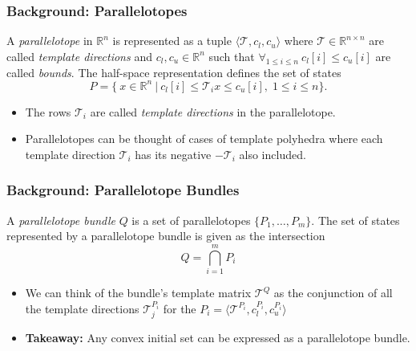 \documentclass{beamer}
\begin{document}
\begin{frame}
  \frametitle{\textbf{Background:} Parallelotopes}
  \begin{definition}
    A \emph{parallelotope} in $\mathbb{R}^n$ is represented as a tuple $\langle \mathcal{T}, c_{l}, c_{u} \rangle$ where $\mathcal{T} \in \mathbb{R}^{n \times n}$ are called \emph{template directions} and $c_{l}, c_{u} \in \mathbb{R}^{n}$ such that $\forall_{1 \leq i \leq n} ~  c_{l}[i] \leq c_{u}[i]$ are called \emph{bounds}. The half-space representation defines the set of states
    $$
    P = \{\: x \in \mathbb{R}^n \: | \: c_{l}[i] \leq \mathcal{T}_{i}x \leq c_{u}[i], \; 1 \leq i \leq n \}.
    $$
   \end{definition}

   \begin{itemize}
     \item The rows $\mathcal{T}_i$ are called \emph{template directions} in the parallelotope.
     \item Parallelotopes can be thought of cases of template polyhedra where each template direction $\mathcal{T}_i$ has its negative $-\mathcal{T}_i $ also included.
   \end{itemize}
\end{frame}



\begin{frame}
\frametitle{\textbf{Background:} Parallelotope Bundles}
\begin{definition}
  A \emph{parallelotope bundle} $Q$ is a set of parallelotopes $\{P_1, \ldots, P_m\}$. The set of states represented by a parallelotope bundle is given as the intersection
\[ Q = \bigcap_{i=1}^m P_i \]
\end{definition}

\begin{itemize}
  \item We can think of the bundle's template matrix $\mathcal{T}^Q$ as the conjunction of all the template directions $\mathcal{T}_j^{P_i}$ for the $P_i = \langle \mathcal{T}^{P_i}, c_{l}^{P_i}, c_{u}^{P_i} \rangle$
      \item \textbf{Takeaway:} Any convex initial set can be expressed as a parallelotope bundle.
\end{itemize}
\end{frame}
\end{document}
